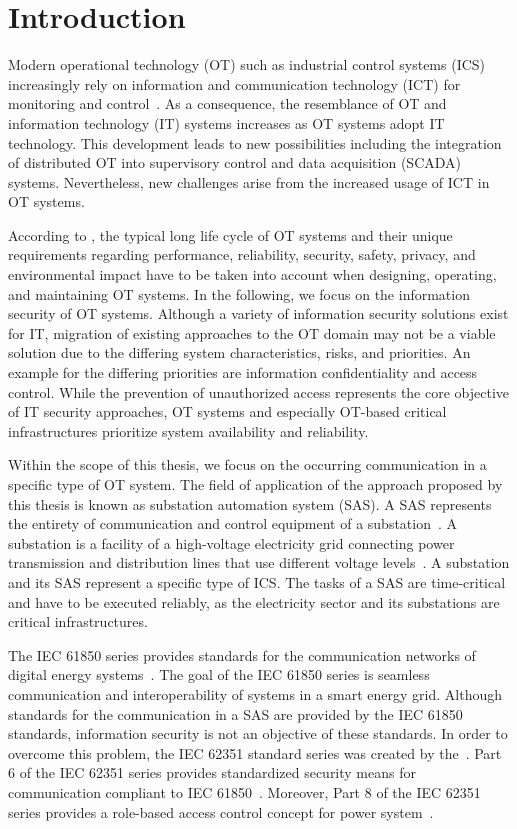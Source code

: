 \chapter{Introduction}
\label{ch:introduction}
Modern operational technology (OT) such as industrial control systems (ICS) increasingly rely on information and communication technology (ICT) for monitoring and control~\cite{Stouffer2023}.
As a consequence, the resemblance of OT and information technology (IT) systems increases as OT systems adopt IT technology.
This development leads to new possibilities including the integration of distributed OT into supervisory control and data acquisition (SCADA) systems.
Nevertheless, new challenges arise from the increased usage of ICT in OT systems.

According to \citeauthor{Stouffer2023} \cite{Stouffer2023}, the typical long life cycle of OT systems and their unique requirements regarding performance, reliability, security, safety, privacy, and environmental impact have to be taken into account when designing, operating, and maintaining OT systems.
In the following, we focus on the information security of OT systems.
Although a variety of information security solutions exist for IT, migration of existing approaches to the OT domain may not be a viable solution due to the differing system characteristics, risks, and priorities.
An example for the differing priorities are information confidentiality and access control.
While the prevention of unauthorized access represents the core objective of IT security approaches, OT systems and especially OT-based critical infrastructures prioritize system availability and reliability.

Within the scope of this thesis, we focus on the occurring communication in a specific type of OT system.
The field of application of the approach proposed by this thesis is known as substation automation system (SAS).
A SAS represents the entirety of communication and control equipment of a substation~\cite{Padilla2015}.
A substation is a facility of a high-voltage electricity grid connecting power transmission and distribution lines that use different voltage levels~\cite{oshaSubstation}.
A substation and its SAS represent a specific type of ICS.
The tasks of a SAS are time-critical and have to be executed reliably, as the electricity sector and its substations are critical infrastructures.

The IEC 61850 series provides standards for the communication networks of digital energy systems~\cite{IEC61850P5}.
The goal of the IEC 61850 series is seamless communication and interoperability of systems in a smart energy grid.
Although standards for the communication in a SAS are provided by the IEC 61850 standards, information security is not an objective of these standards.
In order to overcome this problem, the IEC 62351 standard series was created by the~\citeauthor{IEC62351P6}.
Part 6 of the IEC 62351 series provides standardized security means for communication compliant to IEC 61850~\cite{IEC62351P6}.
Moreover, Part 8 of the IEC 62351 series provides a role-based access control concept for power system~\cite{IEC62351P8}.

